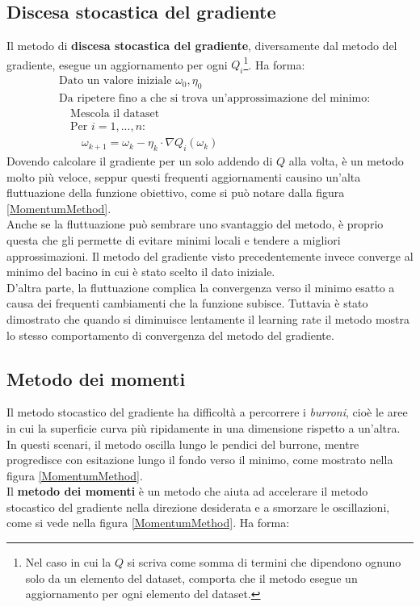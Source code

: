 \subsection{Discesa stocastica del gradiente \cite{bottou2012stochastic}}
Il metodo di \textbf{discesa stocastica del gradiente}, diversamente dal metodo del gradiente, esegue un aggiornamento per ogni $Q_i$\footnote{Nel caso in cui la $Q$ si scriva come somma di termini che dipendono ognuno solo da un elemento del dataset, comporta che il metodo esegue un aggiornamento per ogni elemento del dataset.}. Ha forma:
\begin{align*}
    &\text{Dato un valore iniziale }\omega_0, \eta_0\\
    &\text{Da ripetere fino a che si trova un'approssimazione del minimo:}\\
    &\quad\text{Mescola il dataset}\\
    &\quad\text{Per }i=1,...,n:\\
    &\quad\quad\omega_{k+1}=\omega_k -\eta_k\cdot \nabla Q_i(\omega_k)
\end{align*}
Dovendo calcolare il gradiente per un solo addendo di $Q$ alla volta, è un metodo molto più veloce, seppur questi frequenti aggiornamenti causino un'alta fluttuazione della funzione obiettivo, come si può notare dalla figura \ref{MomentumMethod}.\\
Anche se la fluttuazione può sembrare uno svantaggio del metodo, è proprio questa che gli permette di evitare minimi locali e tendere a migliori approssimazioni. Il metodo del gradiente visto precedentemente invece converge al minimo del bacino in cui è stato scelto il dato iniziale.\\
D'altra parte, la fluttuazione complica la convergenza verso il minimo esatto a causa dei frequenti cambiamenti che la funzione subisce. Tuttavia è stato dimostrato che quando si diminuisce lentamente il learning rate il metodo mostra lo stesso comportamento di convergenza del metodo del gradiente. 


\newpage
\subsection{Metodo dei momenti \cite{ruder_2022}}
Il metodo stocastico del gradiente ha difficoltà a percorrere i \textit{burroni}, cioè le aree in cui la superficie curva più ripidamente in una dimensione rispetto a un'altra. In questi scenari, il metodo oscilla lungo le pendici del burrone, mentre progredisce con esitazione lungo il fondo verso il minimo, come mostrato nella figura \ref{MomentumMethod}.\\
Il \textbf{metodo dei momenti} è un metodo che aiuta ad accelerare il metodo stocastico del gradiente nella direzione desiderata e a smorzare le oscillazioni, come si vede nella figura \ref{MomentumMethod}. Ha forma:

